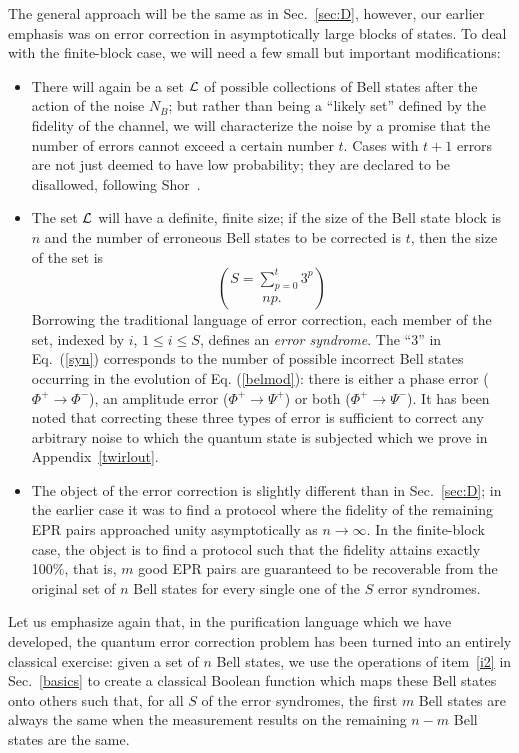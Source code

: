 The general approach will be the same as in Sec.~\ref{sec:D},
however, our earlier emphasis was on error correction in
asymptotically large blocks of states.  To deal with the finite-block
case, we will need a few small but important modifications:
\begin{itemize}
\item There will again be a set ${\cal L}$ of possible collections
of Bell states after the action of the noise $N_B$; but rather
than being a ``likely set'' defined by the fidelity of the channel,
we will characterize the noise by a promise that the number of
errors cannot
exceed a certain number $t$.  Cases with $t+1$ errors are not just
deemed to have low probability; they are declared to be
disallowed, following Shor~\cite{shellgame}.
\item The set ${\cal L}$ will have a definite, finite size; if the
size of the Bell state block is $n$ and the number of erroneous Bell
states to be corrected is $t$, then the size of the set is~\cite{EM}
\begin{equation}
S=\sum_{p=0}^t3^p\choose{n}{p}.\label{syn}
\end{equation}
Borrowing the traditional language of error
correction, each member of the set, indexed by $i$, $1\le i\le S$,
defines an {\it error syndrome}.
The ``3'' in Eq.~(\ref{syn}) corresponds to the number of
possible incorrect Bell states occurring in the evolution of
Eq. (\ref{belmod}): there is either a phase error
($\Phi^+\rightarrow\Phi^-$), an
amplitude error ($\Phi^+\rightarrow\Psi^+$) or both
($\Phi^+\rightarrow\Psi^-$)\cite{Steane,EM}.  It has been noted\cite{CS,EM}
that correcting these three types of error is sufficient to
correct any arbitrary noise to which the quantum state is subjected
which we prove in Appendix~\ref{twirlout}.
\item The object of the error correction is slightly different than in
Sec.~\ref{sec:D}; in the earlier case it was to find a protocol where
the fidelity of the remaining EPR pairs approached unity
asymptotically as $n\rightarrow\infty$.  In the finite-block case,
the object is to find a protocol such that the fidelity attains
exactly 100\%, that is, $m$ good EPR pairs are guaranteed to be
recoverable from the original set of $n$ Bell states for every single
one of the $S$ error syndromes.
\end{itemize}
 
Let us emphasize again that, in the purification language which we
have developed, the quantum error correction problem has been turned
into an entirely classical exercise: given a set of $n$ Bell states,
we use the operations of item~\ref{i2} in Sec.~\ref{basics} to create a
classical Boolean function which maps these Bell states onto others
such that, for all $S$ of the error syndromes, the first $m$ Bell
states are always the same when the measurement results on the
remaining $n\!-\!m$ Bell states are the same.
 
